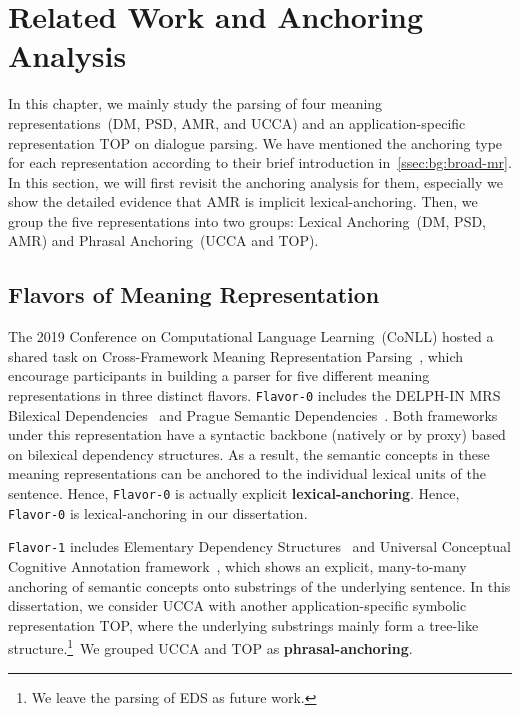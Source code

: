 \section[Related Work and Anchoring Analysis]{Related Work and
  Anchoring Analysis}
\label{sec:lex-phr:factorization-analysis}

In this chapter, we mainly study the parsing of four meaning
representations~(DM, PSD, AMR, and UCCA) and an application-specific
representation TOP on dialogue parsing. We have mentioned the
anchoring type for each representation according to their brief
introduction in~\autoref{ssec:bg:broad-mr}. In this section, we will
first revisit the anchoring analysis for them, especially we show the
detailed evidence that AMR is implicit lexical-anchoring. Then, we
group the five representations into two groups: Lexical Anchoring~(DM,
PSD, AMR) and Phrasal Anchoring~(UCCA and TOP).

\subsection{Flavors of Meaning Representation}
\label{ssec:lex-phr:flavors}

The 2019 Conference on Computational Language Learning~(CoNLL) hosted
a shared task on Cross-Framework Meaning Representation
Parsing~\cite[MRP 2019,][]{Oep:Abe:Haj:19}, which encourage
participants in building a parser for five different meaning
representations in three distinct flavors. \texttt{Flavor-0} includes
the DELPH-IN MRS Bilexical Dependencies~\cite[DM,][]{ivanova2012did}
and Prague Semantic
Dependencies~\cite[PSD,][]{hajic2012announcing,miyao2014house}. Both
frameworks under this representation have a syntactic backbone
(natively or by proxy) based on bilexical dependency
structures. As a result, the semantic concepts in these meaning
representations can be anchored to the individual lexical units of the
sentence. Hence, \texttt{Flavor-0} is actually explicit
\textbf{lexical-anchoring}. Hence, \texttt{Flavor-0} is
lexical-anchoring in our dissertation.

\texttt{Flavor-1} includes Elementary Dependency
Structures~\cite[EDS,][]{oepen2006discriminant} and Universal
Conceptual Cognitive Annotation
framework~\cite[UCCA,][]{abend2013universal}, which shows an explicit,
many-to-many anchoring of semantic concepts onto substrings of the
underlying sentence. In this dissertation, we consider UCCA with another
application-specific symbolic representation TOP, where the underlying
substrings mainly form a tree-like structure.\footnote{We leave the
  parsing of EDS as future work.}~We grouped UCCA and TOP as
\textbf{phrasal-anchoring}.

